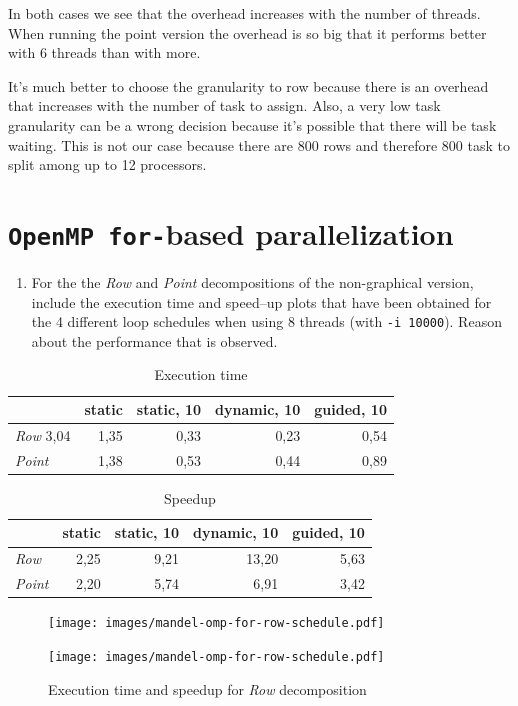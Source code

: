 \documentclass[a4paper]{article}
\begin{document}
In both cases we see that the overhead increases with the number of threads. When running the point version the overhead is so big that it performs better with 6 threads than with more. 


It’s much better to choose the granularity to row because there is an overhead that increases with the number of task to assign. Also, a very low task granularity can be a wrong decision because it’s possible that there will be task waiting. This is not our case because there are  800 rows and therefore 800 task to split among up to 12 processors.

\section{\texttt{OpenMP for-}based parallelization}

\begin{enumerate}
	\item For the the \textit{Row} and \textit{Point} decompositions of the non-graphical version, include the execution time and speed–up plots that have been obtained for the 4 different loop schedules when using 8 threads (with \texttt{-i 10000}). Reason about the performance that is observed.
\end{enumerate}

\begin{table}[H]
	\centering
	\begin{tabular}{l|rrrr}
		& \textbf{static} & \textbf{static, 10} & \textbf{dynamic, 10} & \textbf{guided, 10} \\
		\hline
		\textit{Row} 3,04 & 1,35 & 0,33 & 0,23 & 0,54 \\
		\textit{Point} & 1,38 & 0,53 & 0,44 & 0,89
	\end{tabular}
	\caption{Execution time}
\end{table}
\begin{table}[H]
	\centering
	\begin{tabular}{l|rrrr}
		& \textbf{static} & \textbf{static, 10} & \textbf{dynamic, 10} & \textbf{guided, 10} \\
		\hline
		\textit{Row} & 2,25 & 9,21 & 13,20 & 5,63 \\
		\textit{Point} & 2,20 & 5,74 & 6,91 & 3,42
	\end{tabular}
	\caption{Speedup}
\end{table}
\begin{figure}[H]
	\centering
	\begin{minipage}[t]{0.49\textwidth}
		\texttt{[image: images/mandel-omp-for-row-schedule.pdf]}
	\end{minipage}
	\begin{minipage}[t]{0.49\textwidth}
		\texttt{[image: images/mandel-omp-for-row-schedule.pdf]}
	\end{minipage}
	\caption{Execution time and speedup for \textit{Row} decomposition}
\end{figure}
\end{document}
